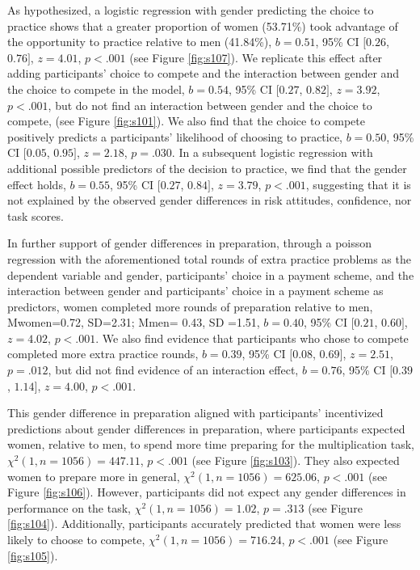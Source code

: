 \documentclass[a4paper,nobind]{templates/ociamthesis}
\begin{document}
As hypothesized, a logistic regression with gender predicting the choice to practice shows that a greater proportion of women (53.71\%) took advantage of the opportunity to practice relative to men (41.84\%), \(b = 0.51\), 95\% CI \([0.26\), \(0.76]\), \(z = 4.01\), \(p < .001\) (see Figure \ref{fig:s107}). We replicate this effect after adding participants' choice to compete and the interaction between gender and the choice to compete in the model, \(b = 0.54\), 95\% CI \([0.27\), \(0.82]\), \(z = 3.92\), \(p < .001\), but do not find an interaction between gender and the choice to compete, (see Figure \ref{fig:s101}). We also find that the choice to compete positively predicts a participants' likelihood of choosing to practice, \(b = 0.50\), 95\% CI \([0.05\), \(0.95]\), \(z = 2.18\), \(p = .030\). In a subsequent logistic regression with additional possible predictors of the decision to practice, we find that the gender effect holds, \(b = 0.55\), 95\% CI \([0.27\), \(0.84]\), \(z = 3.79\), \(p < .001\), suggesting that it is not explained by the observed gender differences in risk attitudes, confidence, nor task scores.

In further support of gender differences in preparation, through a poisson regression with the aforementioned total rounds of extra practice problems as the dependent variable and gender, participants' choice in a payment scheme, and the interaction between gender and participants' choice in a payment scheme as predictors, women completed more rounds of preparation relative to men, Mwomen=0.72, SD=2.31; Mmen= 0.43, SD =1.51, \(b = 0.40\), 95\% CI \([0.21\), \(0.60]\), \(z = 4.02\), \(p < .001\). We also find evidence that participants who chose to compete completed more extra practice rounds, \(b = 0.39\), 95\% CI \([0.08\), \(0.69]\), \(z = 2.51\), \(p = .012\), but did not find evidence of an interaction effect, \(b = 0.76\), 95\% CI \([0.39\), \(1.14]\), \(z = 4.00\), \(p < .001\).

This gender difference in preparation aligned with participants' incentivized predictions about gender differences in preparation, where participants expected women, relative to men, to spend more time preparing for the multiplication task, \(\chi^2(1, n = 1056) = 447.11\), \(p < .001\) (see Figure \ref{fig:s103}). They also expected women to prepare more in general, \(\chi^2(1, n = 1056) = 625.06\), \(p < .001\) (see Figure \ref{fig:s106}). However, participants did not expect any gender differences in performance on the task, \(\chi^2(1, n = 1056) = 1.02\), \(p = .313\) (see Figure \ref{fig:s104}). Additionally, participants accurately predicted that women were less likely to choose to compete, \(\chi^2(1, n = 1056) = 716.24\), \(p < .001\) (see Figure \ref{fig:s105}).
\end{document}
